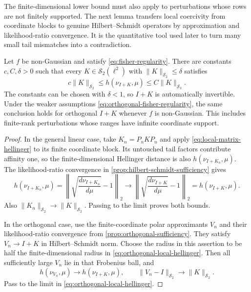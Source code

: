 The finite-dimensional lower bound must also apply to perturbations whose
rows are not finitely supported.
The next lemma transfers local coercivity from coordinate blocks to genuine
Hilbert--Schmidt operators by approximation and likelihood-ratio convergence.
It is the quantitative tool used later to turn many small tail mismatches
into a contradiction.

\begin{lemma}
\label{lem:local-hs-coercivity}
Let $f$ be non-Gaussian and satisfy
\eqref{eq:fisher-regularity}.  There are constants
$c,C,\delta>0$ such that every $K\in\mathcal S_2(\ell^2)$ with
$\|K\|_{\mathcal S_2}\le\delta$ satisfies
\begin{equation}
 c\|K\|_{\mathcal S_2}
 \le h(\nu_{I+K},\mu)
 \le C\|K\|_{\mathcal S_2}.
 \label{eq:local-hs-hellinger}
\end{equation}
The constants can be chosen with $\delta<1$, so $I+K$ is
automatically invertible.  Under the weaker assumptions
\eqref{eq:orthogonal-fisher-regularity}, the same conclusion
holds for orthogonal $I+K$ whenever $f$ is non-Gaussian.
This includes finite-rank perturbations whose ranges have
infinite coordinate support.
\end{lemma}

\begin{proof}
In the general linear case, take $K_n=P_nKP_n$ and apply
\eqref{eq:local-matrix-hellinger} to its finite coordinate
block.  Its untouched tail factors contribute affinity one,
so the finite-dimensional Hellinger distance is also
$h(\nu_{I+K_n},\mu)$.  The likelihood-ratio convergence in
\cref{prop:hilbert-schmidt-sufficiency} gives
\[
 h(\nu_{I+K_n},\mu)
 =\left\|\sqrt{\frac{d\nu_{I+K_n}}{d\mu}}-1\right\|_2
 \longrightarrow
 \left\|\sqrt{\frac{d\nu_{I+K}}{d\mu}}-1\right\|_2
 =h(\nu_{I+K},\mu).
\]
Also $\|K_n\|_{\mathcal S_2}\to\|K\|_{\mathcal S_2}$.
Passing to the limit proves both bounds.

In the orthogonal case, use the finite-coordinate polar
approximants $V_n$ and their likelihood-ratio convergence from
\cref{prop:orthogonal-sufficiency}.  They satisfy
$V_n\to I+K$ in Hilbert--Schmidt norm.  Choose the radius in
this assertion to be half the finite-dimensional radius in
\eqref{eq:orthogonal-local-hellinger}.  Then all sufficiently
large $V_n$ lie in that Frobenius ball, and
\[
 h(\nu_{V_n},\mu)\longrightarrow h(\nu_{I+K},\mu),
 \qquad
 \|V_n-I\|_{\mathcal S_2}\longrightarrow\|K\|_{\mathcal S_2}.
\]
Pass to the limit in \eqref{eq:orthogonal-local-hellinger}.
\end{proof}


